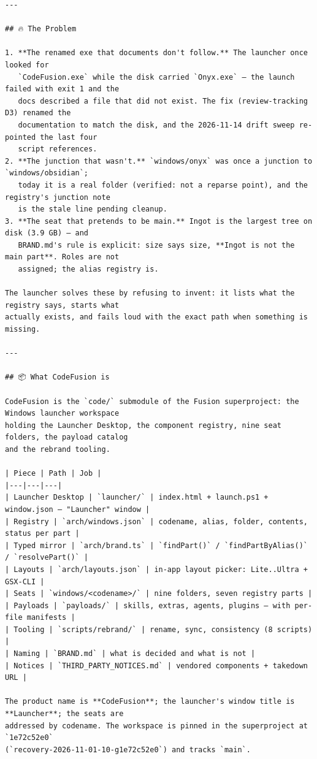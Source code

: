 \begin{Verbatim}[breaklines,breakanywhere,fontsize=\footnotesize]
---

## 🔥 The Problem

1. **The renamed exe that documents don't follow.** The launcher once looked for
   `CodeFusion.exe` while the disk carried `Onyx.exe` — the launch failed with exit 1 and the
   docs described a file that did not exist. The fix (review-tracking D3) renamed the
   documentation to match the disk, and the 2026-11-14 drift sweep re-pointed the last four
   script references.
2. **The junction that wasn't.** `windows/onyx` was once a junction to `windows/obsidian`;
   today it is a real folder (verified: not a reparse point), and the registry's junction note
   is the stale line pending cleanup.
3. **The seat that pretends to be main.** Ingot is the largest tree on disk (3.9 GB) — and
   BRAND.md's rule is explicit: size says size, **Ingot is not the main part**. Roles are not
   assigned; the alias registry is.

The launcher solves these by refusing to invent: it lists what the registry says, starts what
actually exists, and fails loud with the exact path when something is missing.

---

## 📦 What CodeFusion is

CodeFusion is the `code/` submodule of the Fusion superproject: the Windows launcher workspace
holding the Launcher Desktop, the component registry, nine seat folders, the payload catalog
and the rebrand tooling.

| Piece | Path | Job |
|---|---|---|
| Launcher Desktop | `launcher/` | index.html + launch.ps1 + window.json — "Launcher" window |
| Registry | `arch/windows.json` | codename, alias, folder, contents, status per part |
| Typed mirror | `arch/brand.ts` | `findPart()` / `findPartByAlias()` / `resolvePart()` |
| Layouts | `arch/layouts.json` | in-app layout picker: Lite..Ultra + GSX-CLI |
| Seats | `windows/<codename>/` | nine folders, seven registry parts |
| Payloads | `payloads/` | skills, extras, agents, plugins — with per-file manifests |
| Tooling | `scripts/rebrand/` | rename, sync, consistency (8 scripts) |
| Naming | `BRAND.md` | what is decided and what is not |
| Notices | `THIRD_PARTY_NOTICES.md` | vendored components + takedown URL |

The product name is **CodeFusion**; the launcher's window title is **Launcher**; the seats are
addressed by codename. The workspace is pinned in the superproject at `1e72c52e0`
(`recovery-2026-11-01-10-g1e72c52e0`) and tracks `main`.


\end{Verbatim}

